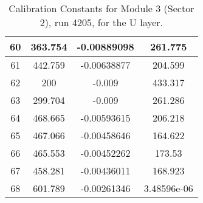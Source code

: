 \begin{table}[h]
{\begin{tabular}{|c|c|c|c|}
60	&	363.754	&	-0.00889098	&	261.775	\\	\hline
61	&	442.759	&	-0.00638877	&	204.599	\\	\hline
62	&	200	&	-0.009	&	433.317	\\	\hline
63	&	299.704	&	-0.009	&	261.286	\\	\hline
64	&	468.665	&	-0.00593615	&	206.218	\\	\hline
65	&	467.066	&	-0.00458646	&	164.622	\\	\hline
66	&	465.553	&	-0.00452262	&	173.53	\\	\hline
67	&	458.281	&	-0.00436011	&	168.923	\\	\hline
68	&	601.789	&	-0.00261346	&	3.48596e-06	\\	\hline
            \end{tabular}
        }
        \caption{Calibration Constants for Module 3 (Sector 2), run 4205, for the U layer.}
\end{table}


